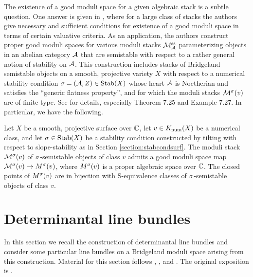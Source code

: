 The existence of a good moduli space for a given algebraic stack is a subtle question. One answer is given in \cite{AHLH}, where for a large class of stacks the authors give necessary and sufficient conditions for existence of a good moduli space in terms of certain valuative criteria. As an application, the authors construct proper good moduli spaces for various moduli stacks $\mathcal{M}^{\mathrm{ss}}_{\mathcal{A}}$ parameterizing objects in an abelian category $\mathcal{A}$ that are semistable with respect to a rather general notion of stability on $\mathcal{A}$. This construction includes stacks of Bridgeland semistable objects on a smooth, projective variety $X$ with respect to a numerical stability condition $\sigma = (\mathcal{A}, Z) \in \operatorname{\mathrm{Stab}}(X)$ whose heart $\mathcal{A}$ is Noetherian and satisfies the ``generic flatness property'', and for which the moduli stacks $\mathcal{M}^\sigma(v)$ are of finite type. See \cite[Section 7]{AHLH} for details, especially Theorem 7.25 and Example 7.27. In particular, we have the following.
\begin{thm}\label{gmsexists}
    Let $X$ be a smooth, projective surface over $\mathbb{C}$, let $v \in K_{\mathrm{num}}(X)$ be a numerical class, and let $\sigma \in \operatorname{\mathrm{Stab}}(X)$ be a stability condition constructed by tilting with respect to slope-stability as in Section \ref{section:stabcondsurf}. The moduli stack $\mathcal{M}^\sigma(v)$ of $\sigma$-semistable objects of class $v$ admits a good moduli space map $\mathcal{M}^\sigma(v) \to M^\sigma(v)$, where $M^\sigma(v)$ is a proper algebraic space over $\mathbb{C}$. The closed points of $M^\sigma(v)$ are in bijection with S-equivalence classes of $\sigma$-semistable objects of class $v$.
\end{thm}



\section{Determinantal line bundles}
In this section we recall the construction of determinantal line bundles and consider some particular line bundles on a Bridgeland moduli space arising from this construction. Material for this section follows \cite[\href{https://stacks.math.columbia.edu/tag/0FJI}{Tag 0FJI}]{stacks-project}, \cite[\href{https://stacks.math.columbia.edu/tag/0FJW}{Tag 0FJW}]{stacks-project}, and \cite[Section 8.1]{HL}. The original exposition is \cite{KM76}.

